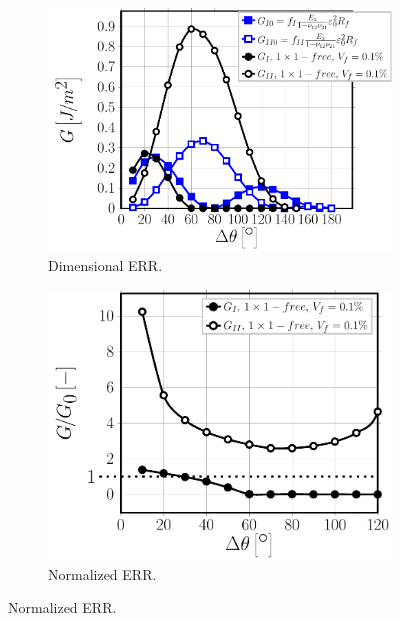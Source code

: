 \documentclass[review]{elsarticle}
\begin{document}
\begin{figure}[!h]
\centering
    \begin{subfigure}[b]{0.475\textwidth}
        \includegraphics[height=0.225\textheight]{comparescaling-Vf01.pdf}
        \caption{Dimensional ERR.}\label{subfig:comparescalingVf01}
    \end{subfigure} \quad
    \begin{subfigure}[b]{0.475\textwidth}
        \includegraphics[height=0.225\textheight]{comparescaling-Vf01-normalized.pdf}
        \caption{Normalized ERR.}\label{subfig:comparescalingVf01normalized}
    \end{subfigure}


\end{figure}
\end{document}
